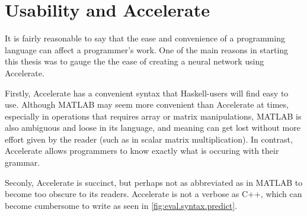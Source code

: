 \section{Usability and Accelerate} \label{se:eval.usability}

It is fairly reasonable to say that the ease and convenience of a programming language can affect a programmer's work. One of the main reasons in starting this thesis was to gauge the the ease of creating a neural network using Accelerate.

Firstly, Accelerate has a convenient syntax that Haskell-users will find easy to use. Although MATLAB may seem more convenient than Accelerate at times, especially in operations that requires array or matrix manipulations, MATLAB is also ambiguous and loose in its language, and meaning can get lost without more effort given by the reader (such as in scalar matrix multiplication). In contrast, Accelerate allows programmers to know exactly what is occuring with their grammar. 

Seconly, Accelerate is succinct, but perhaps not as abbreviated as in MATLAB to become too obscure to its readers. Accelerate is not a verbose as C++, which can become cumbersome to write as seen in \ref{fig:eval.syntax.predict}.

